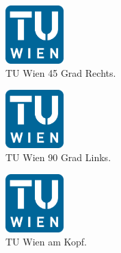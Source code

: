 \documentclass[a4paper, 11pt]{report}
\begin{document}
\begin{figure}[t]
\begin{center}
    \includegraphics[width=0.2\textwidth,angle=-45]{tu.png}
    \caption[45 Grad Rechts]{TU Wien 45 Grad Rechts.}
    \label{fig:bsp1}
\end{center}
\end{figure}

\begin{figure}[t]
\begin{center}
    \includegraphics[width=0.2\textwidth,angle=90]{tu.png}
    \caption[90 Grad Links]{TU Wien 90 Grad Links.}
    \label{fig:bsp2}
\end{center}
\end{figure}

\begin{figure}[t]
\begin{center}
    \includegraphics[width=0.2\textwidth,angle=180]{tu.png}
    \caption{TU Wien am Kopf.}
    \label{fig:bsp3}
\end{center}
\end{figure}

\listoffigures
\end{document}
